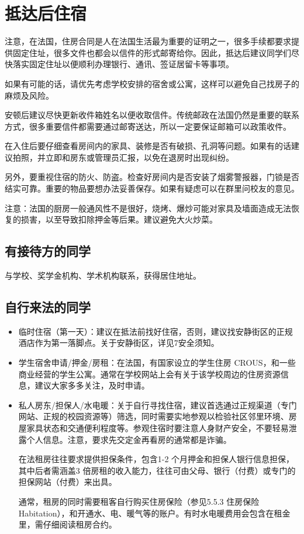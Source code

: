 \section{抵达后住宿}

注意，在法国，住房合同是人在法国生活最为重要的证明之一，很多手续都要求提供固定住址，很多文件也都会以信件的形式邮寄给你。因此，抵达后建议同学们尽快落实固定住址以便顺利办理银行、通讯、签证居留卡等事项。

如果有可能的话，请优先考虑学校安排的宿舍或公寓，这样可以避免自己找房子的麻烦及风险。

安顿后建议尽快更新收件箱姓名以便收取信件。传统邮政在法国仍然是重要的联系方式，很多重要信件都需要通过邮寄送达，所以一定要保证邮箱可以政策收件。

在入住后要仔细查看房间内的家具、装修是否有破损、孔洞等问题。如果有的话建议拍照，并立即和房东或管理员汇报，以免在退房时出现纠纷。

另外，要重视住宿的防火、防盗。检查好房间内是否安装了烟雾警报器，门锁是否结实可靠。重要的物品要想办法妥善保存。如果有疑虑可以在群里问校友的意见。

注意：法国的厨房一般通风性不是很好，烧烤、爆炒可能对家具及墙面造成无法恢复的损害，以至导致扣除押金等后果。建议避免大火炒菜。

\subsection{有接待方的同学}
与学校、奖学金机构、学术机构联系，获得居住地址。

\subsection{自行来法的同学}
\begin{itemize}
    \item 临时住宿（第一天）：建议在抵法前找好住宿，否则，建议找安静街区的正规酒店作为第一落脚点。关于安静街区，详见7安全须知。
    \item 学生宿舍申请/押金/房租：在法国，有国家设立的学生住房 CROUS，和一些商业经营的学生公寓。通常在学校网站上会有关于该学校周边的住房资源信息，建议大家多多关注，及时申请。
    \item 私人房东/担保人/水电暖：关于自行寻找住宿，建议首选通过正规渠道（专门网站、正规的校园资源等）筛选，同时需要实地参观以检验社区邻里环境、房屋家具状态和交通便利程度等。参观住宿时要注意人身财产安全，不要轻易泄露个人信息。注意，要求先交定金再看房的通常都是诈骗。
    
    在法租房往往要求提供担保条件，包含1-2 个月押金和担保人银行信息担保，其中后者需涵盖3 倍房租的收入能力，往往可由父母、银行（付费）或专门的担保网站（付费）来出具。
    
    通常，租房的同时需要租客自行购买住房保险（参见5.5.3 住房保险Habitation），和开通水、电、暖气等的账户。有时水电暖费用会包含在租金里，需仔细阅读租房合约。
\end{itemize}


